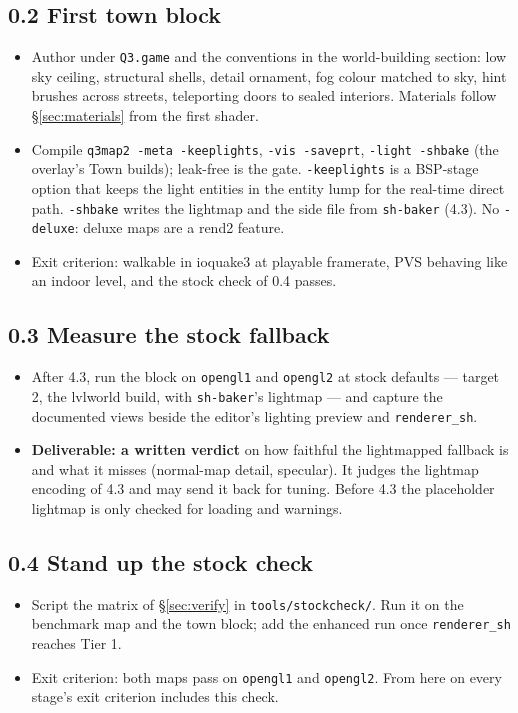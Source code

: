 \documentclass[11pt,a4paper]{article}
\begin{document}
\subsection{0.2 First town block}
\begin{itemize}
\item Author under \texttt{Q3.game} and the conventions in the world-building section: low sky
  ceiling, structural shells, detail ornament, fog colour matched to sky, hint brushes across
  streets, teleporting doors to sealed interiors. Materials follow §\ref{sec:materials} from the first shader.
\item Compile \texttt{q3map2 -meta -keeplights}, \texttt{-vis -saveprt}, \texttt{-light -shbake}
  (the overlay's Town builds); leak-free is the gate. \texttt{-keeplights} is a BSP-stage option
  that keeps the light entities in the entity lump for the real-time direct path. \texttt{-shbake}
  writes the lightmap and the side file from \texttt{sh-baker} (4.3). No \texttt{-deluxe}: deluxe
  maps are a rend2 feature.
\item Exit criterion: walkable in ioquake3 at playable framerate, PVS behaving like an indoor
  level, and the stock check of 0.4 passes.
\end{itemize}

\subsection{0.3 Measure the stock fallback}
\begin{itemize}
\item After 4.3, run the block on \texttt{opengl1} and \texttt{opengl2} at stock defaults --- target
  2, the lvlworld build, with \texttt{sh-baker}'s lightmap --- and capture the documented views
  beside the editor's lighting preview and \texttt{renderer\_sh}.
\item \textbf{Deliverable: a written verdict} on how faithful the lightmapped fallback is and what
  it misses (normal-map detail, specular). It judges the lightmap encoding of 4.3 and may send it
  back for tuning. Before 4.3 the placeholder lightmap is only checked for loading and warnings.
\end{itemize}

\subsection{0.4 Stand up the stock check}
\begin{itemize}
\item Script the matrix of §\ref{sec:verify} in \texttt{tools/stockcheck/}. Run it on the
  benchmark map and the town block; add the enhanced run once \texttt{renderer\_sh} reaches Tier 1.
\item Exit criterion: both maps pass on \texttt{opengl1} and \texttt{opengl2}. From here on every
  stage's exit criterion includes this check.
\end{itemize}
\end{document}
